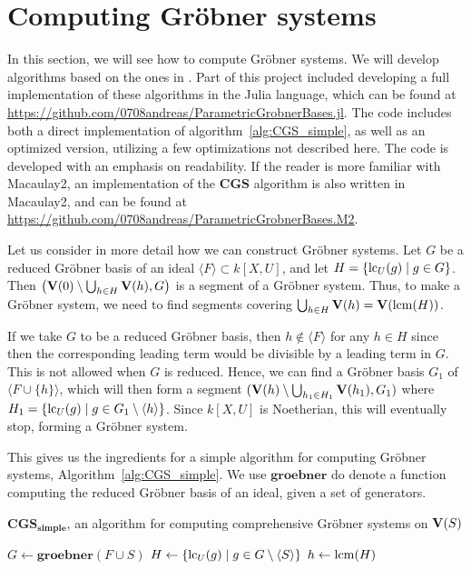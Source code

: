 \section{Computing Gröbner systems}
In this section, we will see how to compute Gröbner systems. We will develop algorithms based on the ones in \cite{ss_algo}. Part of this project included developing a full implementation of these algorithms in the Julia language, which can be found at \url{https://github.com/0708andreas/ParametricGrobnerBases.jl}. The code includes both a direct implementation of algorithm~\ref{alg:CGS_simple}, as well as an optimized version, utilizing a few optimizations not described here. The code is developed with an emphasis on readability. If the reader is more familiar with Macaulay2, an implementation of the $\mathbf{CGS}$ algorithm is also written in Macaulay2, and can be found at \url{https://github.com/0708andreas/ParametricGrobnerBases.M2}.

Let us consider in more detail how we can construct Gröbner systems. Let $G$ be a reduced Gröbner basis of an ideal $\langle F \rangle \subset k[X, U]$, and let $H = \{\operatorname{lc}_{U}(g) \mid g \in G\}$. Then $\left(\operatorname{\mathbf V}(0) \setminus \bigcup_{h \in H} \operatorname{\mathbf V}(h), G\right)$ is a segment of a Gröbner system. Thus, to make a Gröbner system, we need to find segments covering $\bigcup_{h \in H} \operatorname{\mathbf V}(h) = \operatorname{\mathbf V}(\operatorname{lcm}(H))$.

If we take $G$ to be a reduced Gröbner basis, then $h \notin \langle F \rangle$ for any $h \in H$ since then the corresponding leading term would be divisible by a leading term in $G$. This is not allowed when $G$ is reduced. Hence, we can find a Gröbner basis $G_{1}$ of $\langle F \cup \{h\} \rangle$, which will then form a segment $(\operatorname{\mathbf V}(h) \setminus \bigcup_{h_{1} \in H_{1}} \operatorname{\mathbf V}(h_{1}), G_{1})$ where $H_{1} = \{\operatorname{lc}_{U}(g) \mid g \in G_{1} \setminus \langle h \rangle\}$. Since $k[X, U]$ is Noetherian, this will eventually stop, forming a Gröbner system.

This gives us the ingredients for a simple algorithm for computing Gröbner systems, Algorithm~\ref{alg:CGS_simple}. We use $\mathbf{groebner}$ do denote a function computing the reduced Gröbner basis of an ideal, given a set of generators.

\begin{algorithm}
  \caption{$\mathbf{CGS_{simple}}$, an algorithm for computing comprehensive Gröbner systems on $\operatorname{\mathbf V}(S)$}%
  \label{alg:CGS_simple}
    {
    \KwRet{\emptyset}\;
  } {
    $G \gets \mathbf{groebner}(F \cup S)$\;
    $H \gets \{\operatorname{lc}_{U}(g) \mid g \in G \setminus \langle S \rangle\}$\;
    $h \gets \operatorname{lcm}(H)$\;
  }
\end{algorithm}

